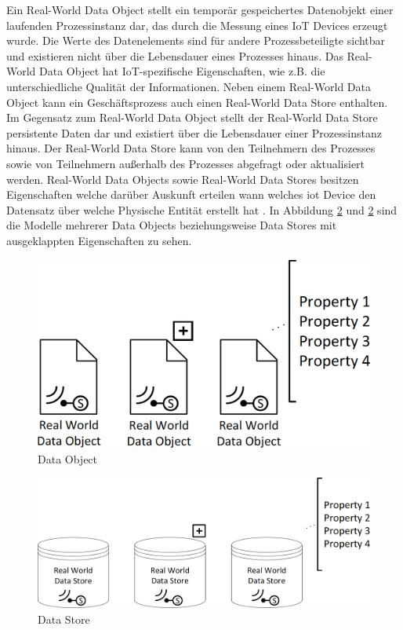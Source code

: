 \documentclass[a4paper, 12pt, twoside, headsepline=true]{scrartcl} %
\begin{document}
Ein Real-World Data Object stellt ein temporär gespeichertes Datenobjekt einer laufenden Prozessinstanz dar, das durch die Messung eines IoT Devices erzeugt wurde. Die Werte des Datenelements sind für andere Prozessbeteiligte sichtbar und existieren nicht über die Lebensdauer eines Prozesses hinaus. Das Real-World Data Object hat IoT-spezifische Eigenschaften, wie z.B. die unterschiedliche Qualität der Informationen. Neben einem Real-World Data Object kann ein Geschäftsprozess auch einen Real-World Data Store enthalten. Im Gegensatz zum Real-World Data Object stellt der Real-World Data Store persistente Daten dar und existiert über die Lebensdauer einer Prozessinstanz hinaus. Der Real-World Data Store kann von den Teilnehmern des Prozesses sowie von Teilnehmern außerhalb des Prozesses abgefragt oder aktualisiert werden. Real-World Data Objects sowie Real-World Data Stores besitzen Eigenschaften welche darüber Auskunft erteilen wann welches \ac{iot} Device den Datensatz über welche Physische Entität erstellt hat \cite[S.64-65]{conceptsiotawarepm}. In Abbildung \ref{fig:datastore} und \ref{fig:datastore} sind die Modelle mehrerer Data Objects beziehungsweise Data Stores mit ausgeklappten Eigenschaften zu sehen.

\begin{figure}[H]
	\includegraphics[height=3.5 cm,keepaspectratio,center]{figures/DataObject}
	\caption{Data Object \cite[S.67]{conceptsiotawarepm}}
	\label{fig:dataobject}
\end{figure} 

\begin{figure}[H]
	\includegraphics[height=3 cm,keepaspectratio,center]{figures/DataStore}
	\caption{Data Store \cite[S.67]{conceptsiotawarepm}}
	\label{fig:datastore}
\end{figure} 
\end{document}
